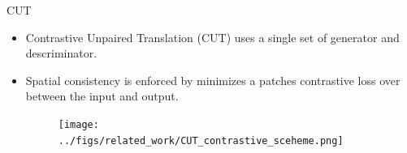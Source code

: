   \begin{frame}{CUT} \label{apndx:cat}
    \begin{itemize}
      \item Contrastive Unpaired Translation (CUT) uses a single set of generator and descriminator.
      \item Spatial consistency is enforced by minimizes a patches contrastive loss over between the input and output.
      \begin{figure}
        \centering
        \texttt{[image: ../figs/related\_work/CUT\_contrastive\_sceheme.png]}
        \end{figure}  
    \end{itemize}
  \end{frame}
  